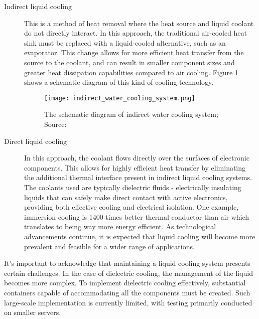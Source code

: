 \documentclass[
  a4paper,  %
  twoside,  %
  bibliography=totoc,
  headsepline,
  cleardoublepage=empty,
  parskip=half,
  draft=false
]{scrbook}
\begin{document}
\begin{description}
	\item[Indirect liquid cooling] This is a method of heat removal where the heat source and liquid coolant do not directly interact. In this approach, the traditional air-cooled heat sink must be replaced with a liquid-cooled alternative, such as an evaporator. This change allows for more efficient heat transfer from the source to the coolant, and can result in smaller component sizes and greater heat dissipation capabilities compared to air cooling\cite{khalaj2017review}. Figure \ref{indirect_cooling} shows a schematic diagram of this kind of cooling technology.
	
	\begin{figure}
		\centering
		\texttt{[image: indirect\_water\_cooling\_system.png]}
		\caption{The schematic diagram of indirect water cooling system; Source: \cite{khalaj2017review}}
		\label{indirect_cooling}
	\end{figure}
	
	\item[Direct liquid cooling] In this approach, the coolant flows directly over the surfaces of electronic components. This allows for highly efficient heat transfer by eliminating the additional thermal interface present in indirect liquid cooling systems. The coolants used are typically dielectric fluids - electrically insulating liquids that can safely make direct contact with active electronics, providing both effective cooling and electrical isolation\cite{khalaj2017review}\cite{submerImmersionCooling}. One example, immersion cooling is 1400 times better thermal conductor than air\cite{submerImmersionCooling} which translates to being way more energy efficient. As technological advancements continue, it is expected that liquid cooling will become more prevalent and feasible for a wider range of applications.
	
\end{description}

It's important to acknowledge that maintaining a liquid cooling system presents certain challenges\cite{azarifar2024liquid}. In the case of dielectric cooling, the management of the liquid becomes more complex\cite{submerImmersionCooling}. To implement dielectric cooling effectively, substantial containers capable of accommodating all the components must be created. Such large-scale implementation is currently limited, with testing primarily conducted on smaller servers.


\end{document}
